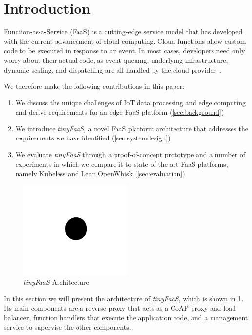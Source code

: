 \section{Introduction}\label{sec:introduction}

Function-as-a-Service (FaaS) is a cutting-edge service model that has developed with the current advancement of cloud computing.
Cloud functions allow custom code to be executed in response to an event.
In most cases, developers need only worry about their actual code, as event queuing, underlying infrastructure, dynamic scaling, and dispatching are all handled by the cloud provider~\cite{schirmer2023fusionize}.

We therefore make the following contributions in this paper:

\begin{enumerate}
    \item We discuss the unique challenges of IoT data processing and edge computing and derive requirements for an edge FaaS platform (\cref{sec:background})
    \item We introduce \textit{tinyFaaS}, a novel FaaS platform architecture that addresses the requirements we have identified (\cref{sec:systemdesign})
    \item We evaluate \textit{tinyFaaS} through a proof-of-concept prototype and a number of experiments in which we compare it to state-of-the-art FaaS platforms, namely Kubeless and Lean OpenWhisk (\cref{sec:evaluation})
\end{enumerate}

\begin{figure}
    \centering
    \includegraphics[width=0.5\textwidth]{graphs/fig1.png}
    \caption{\textit{tinyFaaS} Architecture}
    \label{img:systemdesign}
\end{figure}

In this section we will present the architecture of \textit{tinyFaaS}, which is shown in \cref{img:systemdesign}.
Its main components are a reverse proxy that acts as a CoAP proxy and load balancer, function handlers that execute the application code, and a management service to supervise the other components.
